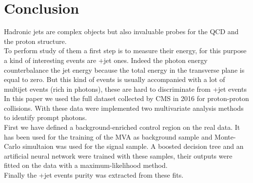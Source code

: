 \chapter*{Conclusion}
\label{sec:conclusion}

Hadronic jets are complex objects but also invaluable probes for the QCD and the proton structure.\\
To perform study of them a first step is to measure their energy, for this purpose a kind of interesting events are \textgamma+jet ones.
Indeed the photon energy counterbalance the jet energy because the total energy in the transverse plane is equal to zero.
But this kind of events is usually accompanied with a lot of multijet events (rich in photons), these are hard to discriminate from \textgamma+jet events\\
In this paper we used the full dataset collected by CMS in 2016 for proton-proton collisions.
With these data were implemented two multivariate analysis methods to identify prompt photons.\\
First we have defined a background-enriched control region on the real data.
It has been used for the training of the MVA as background sample and Monte-Carlo simultaion was used for the signal sample.
A boosted decision tree and an artificial neural network were trained with these samples, their outputs were fitted on the data with a maximum-likelihood method.\\
Finally the \textgamma+jet events purity was extracted from these fits.





